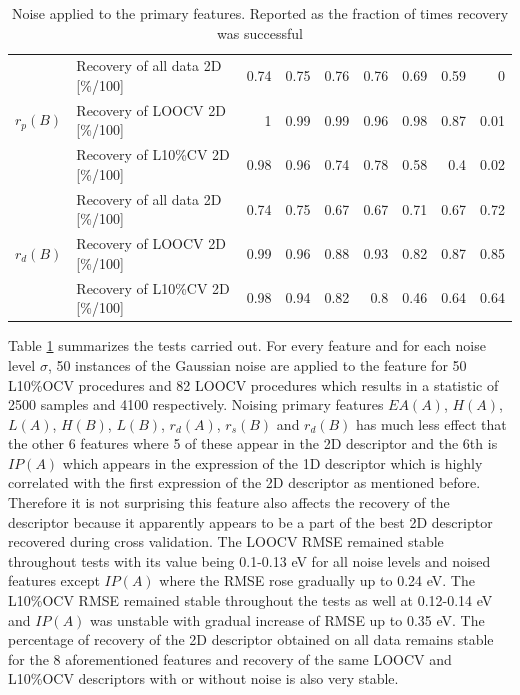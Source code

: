 \documentclass[11pt,oneside,czech,american]{book} %
\theoremstyle{definition} %
\theoremstyle{definition}
\begin{document}
\begin{table}[H]
\begin{tabular}{llrrrrrrr}
	\hline
	\multirow{3}{*}{$r_p(B)$} & Recovery of all data 2D [\%/100] & 0.74          & 0.75          & 0.76          & 0.76         & 0.69          & 0.59          & 0              \\
	& Recovery of LOOCV 2D [\%/100]    & 1             & 0.99          & 0.99          & 0.96         & 0.98          & 0.87          & 0.01           \\
	& Recovery of L10\%CV 2D [\%/100]  & 0.98          & 0.96          & 0.74          & 0.78         & 0.58          & 0.4           & 0.02           \\ 
	\hline
	\multirow{3}{*}{$r_d(B)$} & Recovery of all data 2D [\%/100] & 0.74          & 0.75          & 0.67          & 0.67         & 0.71          & 0.67          & 0.72           \\
	& Recovery of LOOCV 2D [\%/100]    & 0.99          & 0.96          & 0.88          & 0.93         & 0.82          & 0.87          & 0.85           \\
	& Recovery of L10\%CV 2D [\%/100]  & 0.98          & 0.94          & 0.82          & 0.8          & 0.46          & 0.64          & 0.64           \\
	\hline
\end{tabular}
	\caption{Noise applied to the primary features. Reported as the fraction of times recovery was successful}
	\label{big}
\end{table}
Table \ref{big} summarizes the tests carried out. For every feature and for each noise level $\sigma$, 50 instances of the Gaussian noise are applied to the feature for 50 L10\%OCV procedures and 82 LOOCV procedures which results in a statistic of 2500 samples and 4100 respectively. Noising primary features $EA(A)$, $H(A)$, $L(A)$, $H(B)$, $L(B)$, $r_d(A)$, $r_s(B)$ and $r_d(B)$ has much less effect that the other 6 features where 5 of these appear in the 2D descriptor and the 6th is $IP(A)$ which appears in the expression of the 1D descriptor which is highly correlated with the first expression of the 2D descriptor as mentioned before. Therefore it is not surprising this feature also affects the recovery of the descriptor because it apparently appears to be a part of the best 2D descriptor recovered during cross validation. 
The LOOCV RMSE remained stable throughout tests with its value being 0.1-0.13 eV for all noise levels and noised features except $IP(A)$ where the RMSE rose gradually up to 0.24 eV. The L10\%OCV RMSE remained stable throughout the tests as well at 0.12-0.14 eV and $IP(A)$ was unstable with gradual increase of RMSE up to 0.35 eV.
The percentage of recovery of the 2D descriptor obtained on all data remains stable for the 8 aforementioned features and recovery of the same LOOCV and L10\%OCV descriptors with or without noise is also very stable.
\end{document}
